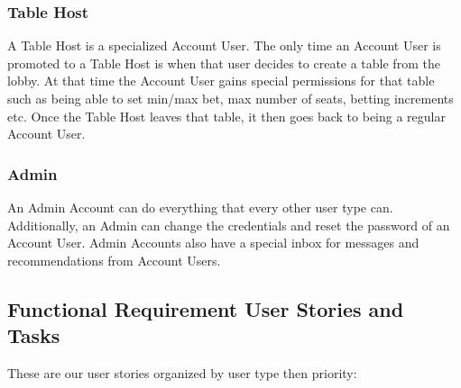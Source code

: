 \subsubsection{Table Host}
A Table Host is a specialized Account User. The only time an Account User is promoted to a Table Host is when that user decides to create a table from the lobby. At that time the Account User gains special permissions for that table such as being able to set min/max bet, max number of seats, betting increments etc. Once the Table Host leaves that table, it then goes back to being a regular Account User.

\subsubsection{Admin}
An Admin Account can do everything that every other user type can. Additionally, an Admin can change the credentials and reset the password of an Account User. Admin Accounts also have a special inbox for messages and recommendations from Account Users.

\subsection{Functional Requirement User Stories and Tasks}





These are our user stories organized by user type then priority: \\

